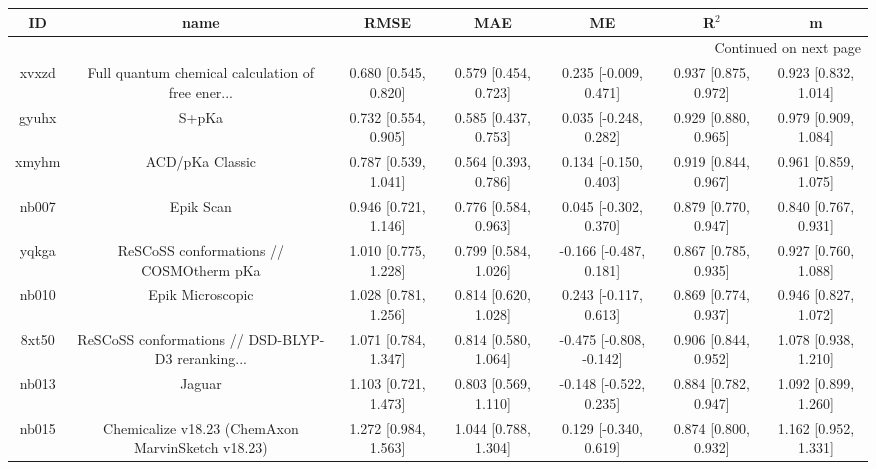 \documentclass{article}
\begin{document}
\begin{center}
\begin{longtable}{|ccccccc|}
\toprule
    ID &                                               name &                  RMSE &                   MAE &                       ME &                 R$^2$ &                      m \\
\midrule
\endhead
\midrule
\multicolumn{7}{r}{{Continued on next page}} \\
\midrule
\endfoot

\bottomrule
\endlastfoot
 xvxzd &  Full quantum chemical calculation of free ener... &  0.680 [0.545, 0.820] &  0.579 [0.454, 0.723] &    0.235 [-0.009, 0.471] &  0.937 [0.875, 0.972] &   0.923 [0.832, 1.014] \\
 gyuhx &                                              S+pKa &  0.732 [0.554, 0.905] &  0.585 [0.437, 0.753] &    0.035 [-0.248, 0.282] &  0.929 [0.880, 0.965] &   0.979 [0.909, 1.084] \\
 xmyhm &                                    ACD/pKa Classic &  0.787 [0.539, 1.041] &  0.564 [0.393, 0.786] &    0.134 [-0.150, 0.403] &  0.919 [0.844, 0.967] &   0.961 [0.859, 1.075] \\
 nb007 &                                          Epik Scan &  0.946 [0.721, 1.146] &  0.776 [0.584, 0.963] &    0.045 [-0.302, 0.370] &  0.879 [0.770, 0.947] &   0.840 [0.767, 0.931] \\
 yqkga &            ReSCoSS conformations // COSMOtherm pKa &  1.010 [0.775, 1.228] &  0.799 [0.584, 1.026] &   -0.166 [-0.487, 0.181] &  0.867 [0.785, 0.935] &   0.927 [0.760, 1.088] \\
 nb010 &                                   Epik Microscopic &  1.028 [0.781, 1.256] &  0.814 [0.620, 1.028] &    0.243 [-0.117, 0.613] &  0.869 [0.774, 0.937] &   0.946 [0.827, 1.072] \\
 8xt50 &  ReSCoSS conformations // DSD-BLYP-D3 reranking... &  1.071 [0.784, 1.347] &  0.814 [0.580, 1.064] &  -0.475 [-0.808, -0.142] &  0.906 [0.844, 0.952] &   1.078 [0.938, 1.210] \\
 nb013 &                                             Jaguar &  1.103 [0.721, 1.473] &  0.803 [0.569, 1.110] &   -0.148 [-0.522, 0.235] &  0.884 [0.782, 0.947] &   1.092 [0.899, 1.260] \\
 nb015 &  Chemicalize v18.23 (ChemAxon MarvinSketch v18.23) &  1.272 [0.984, 1.563] &  1.044 [0.788, 1.304] &    0.129 [-0.340, 0.619] &  0.874 [0.800, 0.932] &   1.162 [0.952, 1.331] \\

\end{longtable}
\end{center}
\end{document}

